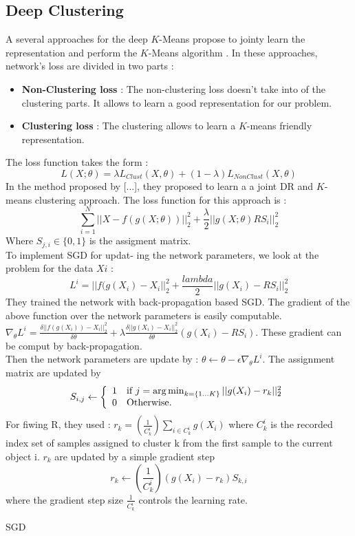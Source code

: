 \subsection{Deep Clustering}\label{seq:DeepClust}
A several approaches for the deep $K$-Means propose to jointy learn the
representation and perform the $K$-Means algorithm \cite{2018arXiv180107648A}.
In these approaches, network's loss are divided in two parts :
\begin{itemize}
\item \textbf{Non-Clustering loss} : The non-clustering loss doesn't
  take into of the clustering parts. It allows to learn a good
  representation for our problem.
\item \textbf{Clustering loss} : The clustering allows to learn a
  $K$-means friendly representation.
\end{itemize}
The loss function takes the form :
$$
L(X;\theta) = \lambda L_{Clust}(X,\theta) + (1-\lambda)L_{NonClust}
(X,\theta)
$$
In the method proposed by [...], they proposed to learn a  a joint DR and
$K$-means clustering approach. The loss function for this approach is :
$$ \sum_{i=1}^N ||X - f(g(X;\theta))||_2^2 + \frac{\lambda}{2}||g(X;\theta)
RS_i||_2^2$$
Where $S_{j,i} \in \{0,1\}$ is the assigment matrix.
\\ To implement SGD for updat-
ing the network parameters, we look at the problem for the data
$Xi$ :
$$ L^i = ||f(g(X_i) -X_i||_2^2 + \frac{lambda}{2}||g(X_i) -RS_i||_2^2$$
They trained the network with back-propagation based SGD. The
gradient of the above function over the network parameters is easily
computable. $\nabla_\theta L^i = \frac{\delta||f(g(X_i)) -X_i||_2^2}
{\delta\theta} + \lambda\frac{\delta||g(X_i) -X_i||_2^2}{\delta \theta}
(g(X_i) - RS_i)$. These gradient can be comput by back-propagation.\\
Then the network parameters are update by : $\theta \gets \theta -
\epsilon\nabla_\theta L^i$. The assignment matrix are updated by
\begin{equation*}
  S_{i,j} \gets \left\{
\begin{array}{ll}
  1 & \mbox{if } j = \operatorname*{arg\,min}_{k = \{1 ... K\}}||g(X_i) - r_k||_2^2\\
  0 & \mbox{Otherwise.}
\end{array}
\right.
\end{equation*}
For fiwing R, they used : $r_k = (\frac{1}{C_k^i})\sum_{i \in C_k^i}
g(X_i)$ where $C_k^i$ is the recorded index set of samples assigned to
cluster k from the first sample to the current object i.
$r_k$ are updated by a simple gradient step
$$r_k \gets (\frac{1}{C_k^i})(g(X_i)-r_k)S_{k,i}$$
where the gradient step size $\frac{1}{C_k^i}$ controls the learning
rate.
\begin{algorithm}[!h]
  \caption{SGD}
\end{algorithm}
